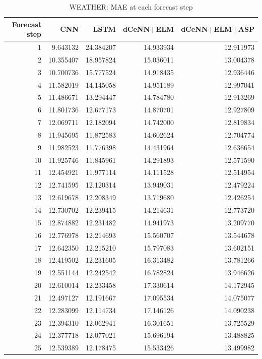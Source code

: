 \begin{table}
\caption{WEATHER: MAE at each forecast step}
\begin{tabular}{rrrrr}
\toprule
Forecast step & CNN & LSTM & dCeNN+ELM & dCeNN+ELM+ASP \\
\midrule
1 & 9.643132 & 24.384207 & 14.933934 & 12.911973 \\
2 & 10.355407 & 18.957824 & 15.036011 & 13.004378 \\
3 & 10.700736 & 15.777524 & 14.918435 & 12.936446 \\
4 & 11.582019 & 14.145058 & 14.951189 & 12.997041 \\
5 & 11.486671 & 13.294447 & 14.784780 & 12.913269 \\
6 & 11.801736 & 12.677173 & 14.870701 & 12.927809 \\
7 & 12.069711 & 12.182094 & 14.742000 & 12.819834 \\
8 & 11.945695 & 11.872583 & 14.602624 & 12.704774 \\
9 & 11.982523 & 11.776398 & 14.431964 & 12.636654 \\
10 & 11.925746 & 11.845961 & 14.291893 & 12.571590 \\
11 & 12.454921 & 11.977114 & 14.111528 & 12.514954 \\
12 & 12.741595 & 12.120314 & 13.949031 & 12.479224 \\
13 & 12.619678 & 12.208349 & 13.719680 & 12.426254 \\
14 & 12.730702 & 12.239415 & 14.214631 & 12.773720 \\
15 & 12.874882 & 12.231482 & 14.941973 & 13.209770 \\
16 & 12.776978 & 12.214693 & 15.560707 & 13.544678 \\
17 & 12.642350 & 12.215210 & 15.797083 & 13.602151 \\
18 & 12.419502 & 12.231605 & 16.313482 & 13.781266 \\
19 & 12.551144 & 12.242542 & 16.782824 & 13.946626 \\
20 & 12.610014 & 12.233458 & 17.330614 & 14.172945 \\
21 & 12.497127 & 12.191667 & 17.095534 & 14.075077 \\
22 & 12.283099 & 12.114734 & 17.146126 & 14.090238 \\
23 & 12.394310 & 12.062941 & 16.301651 & 13.725529 \\
24 & 12.377718 & 12.077021 & 15.696194 & 13.488825 \\
25 & 12.539389 & 12.178475 & 15.533426 & 13.499982 \\

\end{tabular}
\end{table}
